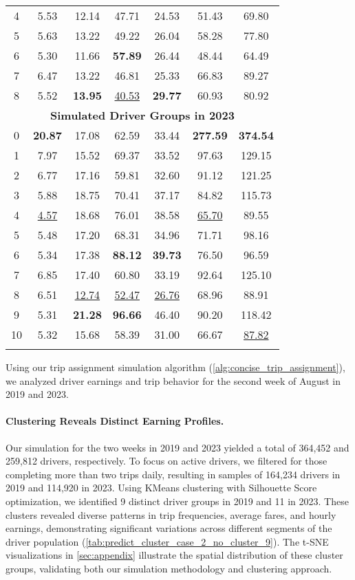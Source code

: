 \begin{table}[ht]
\begin{tabular}{ccccccc}
4 & 5.53 & 12.14 & 47.71 & 24.53 & 51.43 & 69.80 \\
5 & 5.63 & 13.22 & 49.22 & 26.04 & 58.28 & 77.80 \\
6 & 5.30 & 11.66 & \textbf{57.89} & 26.44 & 48.44 & 64.49 \\
7 & 6.47 & 13.22 & 46.81 & 25.33 & 66.83 & 89.27 \\
8 & 5.52 & \textbf{13.95} & \underline{40.53} & \textbf{29.77} & 60.93 & 80.92 \\
\midrule
\multicolumn{7}{c}{\textbf{Simulated Driver Groups in 2023}}\\
\midrule
0 & \textbf{20.87} & 17.08 & 62.59 & 33.44 & \textbf{277.59} & \textbf{374.54} \\
1 & 7.97 & 15.52 & 69.37 & 33.52 & 97.63 & 129.15 \\
2 & 6.77 & 17.16 & 59.81 & 32.60 & 91.12 & 121.25 \\
3 & 5.88 & 18.75 & 70.41 & 37.17 & 84.82 & 115.73 \\
4 & \underline{4.57} & 18.68 & 76.01 & 38.58 & \underline{65.70} & 89.55 \\
5 & 5.48 & 17.20 & 68.31 & 34.96 & 71.71 & 98.16 \\
6 & 5.34 & 17.38 & \textbf{88.12} & \textbf{39.73} & 76.50 & 96.59 \\
7 & 6.85 & 17.40 & 60.80 & 33.19 & 92.64 & 125.10 \\
8 & 6.51 & \underline{12.74} & \underline{52.47} & \underline{26.76} & 68.96 & 88.91 \\
9 & 5.31 & \textbf{21.28} & \textbf{96.66} & 46.40 & 90.20 & 118.42 \\
10 & 5.32 & 15.68 & 58.39 & 31.00 & 66.67 & \underline{87.82} \\
\bottomrule
\label{table:earning_driver}
\end{tabular}
\end{table}


Using our trip assignment simulation algorithm (\cref{alg:concise_trip_assignment}), we analyzed driver earnings and trip behavior for the second week of August in 2019 and 2023.


\paragraph{\textbf{Clustering Reveals Distinct Earning Profiles.}}

Our simulation for the two weeks in 2019 and 2023 yielded a total of 364,452 and 259,812 drivers, respectively. To focus on active drivers, we filtered for those completing more than two trips daily, resulting in samples of 164,234 drivers in 2019 and 114,920 in 2023. Using KMeans clustering with Silhouette Score optimization, we identified 9 distinct driver groups in 2019 and 11 in 2023. These clusters revealed diverse patterns in trip frequencies, average fares, and hourly earnings, demonstrating significant variations across different segments of the driver population (\cref{tab:predict_cluster_case_2_no_cluster_9}). The t-SNE visualizations in \cref{sec:appendix} illustrate the spatial distribution of these cluster groups, validating both our simulation methodology and clustering approach.

